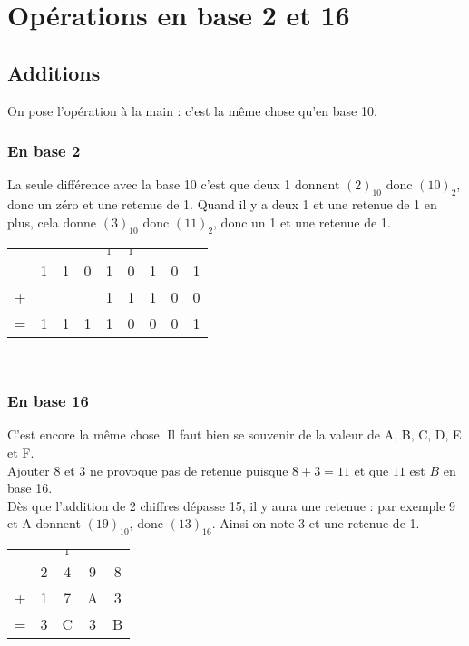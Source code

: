 \chapter{Opérations en base 2 et 16}
\section{Additions}

\tabulardefault
On pose l'opération à la main : c'est la même chose qu'en base 10.
\subsection{En base 2}
La seule différence avec la base 10 c'est que deux 1 donnent $(2)_{10}$ donc $(10)_2$, donc un zéro et une retenue de 1.
Quand il y a deux 1 et une retenue de 1 en plus, cela donne $(3)_{10}$ donc $(11)_2$, donc un 1 et une retenue de 1.

\begin{exemple}[]
	\begin{center}
		\begin{tabular}{ccccccccc}
			  &   &   &   & $_1$ & $_1$ &   &   &   \\
			  & 1 & 1 & 0 & 1    & 0    & 1 & 0 & 1 \\
			+ &   &   &   & 1    & 1    & 1 & 0 & 0 \\
			\hline
			= & 1 & 1 & 1 & 1    & 0    & 0 & 0 & 1 \\
		\end{tabular} \\[2em]
	\end{center}
\end{exemple}

\subsection{En base 16}

C'est encore la même chose. Il faut bien se souvenir de la valeur de A, B, C, D, E et F.\\
Ajouter 8 et 3 ne provoque pas de retenue puisque $8+3=11$ et que $11$ est $B$ en base 16.\\
Dès que l'addition de 2 chiffres dépasse 15, il y aura une retenue : par exemple 9 et A donnent $(19)_{10}$, donc $(13)_{16}$. Ainsi on note 3 et une retenue de 1.


\begin{exemple}
	\begin{center}
		\begin{tabular}{ccccc}
			  &   & $_1$ &   &   \\
			  & 2 & 4    & 9 & 8 \\
			+ & 1 & 7    & A & 3 \\
			\hline
			= & 3 & C    & 3 & B \\
		\end{tabular}
	\end{center}
\end{exemple}

